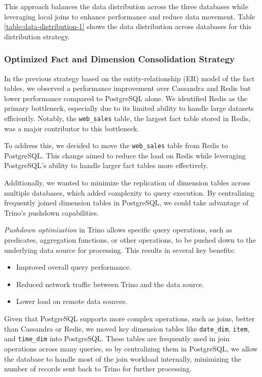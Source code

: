 \documentclass[conference]{IEEEtran}
\begin{document}
This approach balances the data distribution across the three databases while leveraging local joins
to enhance performance and reduce data movement. Table \ref{table:data-distribution-1} shows the data distribution across databases for this distribution strategy.

\subsubsection{Optimized Fact and Dimension Consolidation Strategy}

In the previous strategy based on the entity-relationship (ER) model of the fact tables, we observed a
performance improvement over Cassandra and Redis but lower performance compared to PostgreSQL alone.
We identified Redis as the primary bottleneck, especially due to its limited ability to handle large
datasets efficiently. Notably, the \texttt{web\_sales} table, the largest fact table stored in Redis,
was a major contributor to this bottleneck.

To address this, we decided to move the \texttt{web\_sales} table from Redis to PostgreSQL.
This change aimed to reduce the load on Redis while leveraging PostgreSQL's ability to handle larger
fact tables more effectively.

Additionally, we wanted to minimize the replication of dimension tables across multiple databases,
which added complexity to query execution. By centralizing frequently joined dimension tables in
PostgreSQL, we could take advantage of Trino’s pushdown capabilities.

\textit{Pushdown optimization} \cite{b13} in Trino allows specific query operations, such as predicates, aggregation
functions, or other operations, to be pushed down to the underlying data source for processing.
This results in several key benefits:
\begin{itemize}
	\item Improved overall query performance.
	\item Reduced network traffic between Trino and the data source.
	\item Lower load on remote data sources.
\end{itemize}

Given that PostgreSQL supports more complex operations, such as joins, better than Cassandra or Redis,
we moved key dimension tables like \texttt{date\_dim}, \texttt{item}, and \texttt{time\_dim} into PostgreSQL.
These tables are frequently used in join operations across many queries, so by centralizing them in PostgreSQL,
we allow the database to handle most of the join workload internally, minimizing the number of records sent
back to Trino for further processing.
\end{document}
